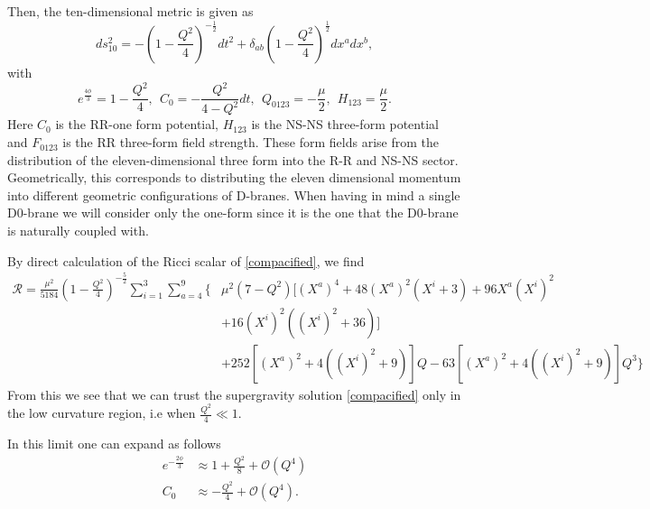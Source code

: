 \documentclass[11pt,english]{article}
\newcommand{\be}{\begin{equation}}
\newcommand{\ee}{\end{equation}}
\def\nn{\nonumber}
\numberwithin{equation}{section}
\begin{document}
\noindent
Then, the ten-dimensional metric is given as 
\be \label{compacified}
ds^2_{10}=-\left(1-\frac{Q^2}{4}\right)^{-\frac{1}{2}}dt^2+\delta_{ab}\left(1-\frac{Q^2}{4}\right)^{\frac{1}{2}}dx^adx^b,
\ee
with 
\be 
e^{\frac{4\phi}{3}}=1-\frac{Q^2}{4},~~C_0=-\frac{Q^2}{4-Q^2}dt,~~ Q_{0123}=-\frac{\mu }{2},~~ H_{123}=\frac{\mu}{2}.
\ee
Here $C_0$ is the RR-one form potential, $H_{123}$ is the NS-NS three-form potential and $F_{0123}$ is the RR three-form field strength. These form fields arise from the distribution of the eleven-dimensional three form into the R-R and NS-NS sector.  Geometrically, this corresponds to distributing the eleven dimensional momentum into different geometric configurations of  D-branes. When having in mind a single D0-brane we will consider only the one-form since it is the one that the D0-brane is naturally coupled with.

By direct calculation of the Ricci scalar of \eqref{compacified}, we find 
\begin{align} \nn
\mathcal{R}=\frac{\mu ^2}{5184}\left(1-\frac{Q^2}{4}\right)^{-\frac{5}{2}}\sum_{i=1}^3\sum_{a=4}^9 \Bigg\{&\mu ^2(7-Q^2) \Big[(X^a)^4+48 (X^a)^2 (X^i+3)+96 X^a (X^i)^2\\
\nn&+16 (X^i)^2 \left((X^i)^2+36\right)\Big]\\ 
&+252 \left[(X^a)^2+4 \left((X^i)^2+9\right)\right] Q-63 \left[(X^a)^2+4 \left((X^i)^2+9\right)\right] Q^3 \Bigg\}
\end{align}
From this we see that we can trust the supergravity solution \eqref{compacified} only in the low curvature region, i.e when $\frac{Q^2}{4}\ll 1$. 

\noindent
In this limit one can expand as follows 
\begin{align}\nn
 e^{-\frac{2\phi}{3}}&\approx 1+\frac{Q^2}{8}+\mathcal{O}\left(Q^4\right)\\
 \nn C_0&\approx-\frac{Q^2}{4} +\mathcal{O}\left(Q^4\right).
\end{align}
\end{document}
